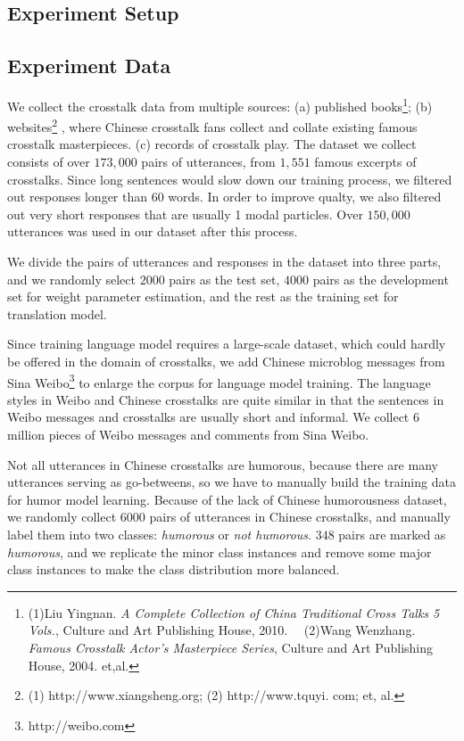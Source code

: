 \documentclass[letterpaper]{article} %
\begin{document}
\begin{CJK*}{UTF8}{gbsn}
\section{Experiment Setup}

\subsection{Experiment Data}

We collect the crosstalk data from multiple sources: (a) published books\footnote{(1)Liu Yingnan. {\it A Complete Collection of China Traditional Cross Talks 5 Vols.}, Culture and Art Publishing House, 2010.~~ (2)Wang Wenzhang. {\it Famous Crosstalk Actor's Masterpiece Series},  Culture and Art Publishing House, 2004. et,al.}; (b) websites\footnote{(1) http://www.xiangsheng.org; (2) http://www.tquyi. com; et, al. %
} , where Chinese crosstalk fans collect and collate existing famous crosstalk masterpieces.  (c) records of crosstalk play.
The dataset we collect consists of over $173,000$ pairs of utterances, from $1,551$ famous excerpts of crosstalks. Since long sentences would slow down our training process, we filtered out responses longer than 60 words. In order to improve qualty, we also filtered  out very short responses that are usually 1 modal particles. Over $150,000$ utterances was used in our dataset after this process.

We divide the pairs of utterances and responses in the dataset into three parts, and we randomly select $2000$ pairs as the test set, $4000$ pairs as the development set for weight parameter estimation, and the rest as the training set for translation model.

Since training language model requires a large-scale dataset, which could hardly be offered in the domain of crosstalks, we add Chinese microblog messages from Sina Weibo\footnote{http://weibo.com} to enlarge the corpus for language model training. The language styles in Weibo and Chinese crosstalks are quite similar in that the sentences in Weibo messages and crosstalks are usually short and informal. We collect 6 million pieces of Weibo messages and comments from Sina Weibo.

Not all utterances in Chinese crosstalks are humorous, because there are many utterances serving as go-betweens, so we have to manually build the training data for humor model learning. Because of the lack of Chinese humorousness dataset, we randomly collect $6000$ pairs of utterances in Chinese crosstalks, and manually label them into two classes: {\it humorous} or {\it not humorous}. $348$ pairs are marked as  {\it humorous}, and we replicate the minor class instances and remove some major class instances to make the class distribution more balanced. 


\end{CJK*}
\end{document}
